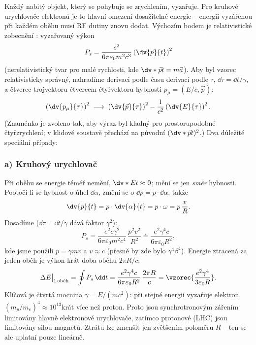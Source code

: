 Každý nabitý objekt, který se pohybuje se zrychlením, vyzařuje. Pro
kruhové urychlovače elektronů je to hlavní omezení dosažitelné energie --
energii vyzářenou při každém oběhu musí RF dutiny znovu dodat. Výchozím
bodem je relativistické zobecnění : vyzařovaný výkon
\[
  P_s=\frac{e^2}{6\pi\varepsilon_0 m^2c^3}\left(\dv{\vec p}{t}\right)^2
\]
(nerelativistický tvar pro malé rychlosti, kde \(\dv*{\vec p}{t}=m\vec a\)).
Aby byl vzorec relativisticky správný, nahradíme derivaci podle času
derivací podle  \(\tau\), \(\dd\tau=\dd t/\gamma\), a
čtverec trojvektoru čtvercem čtyřvektoru hybnosti \(p_\mu=(E/c,\vec p)\):
\[
  \left(\dv{p_\mu}{\tau}\right)^2\;\longrightarrow\;
  \left(\dv{\vec p}{\tau}\right)^2-\frac{1}{c^2}\left(\dv{E}{\tau}\right)^2 .
\]
(Znaménko je zvoleno tak, aby výraz byl kladný pro prostorupodobné
čtyřzrychlení; v klidové soustavě přechází na původní
\((\dv*{\vec p}{t})^2\).) Dva důležité speciální případy:

\subsubsection*{a) Kruhový urychlovač}
Při oběhu se energie téměř nemění, \(\dv*{E}{t}\approx0\); mění se jen
\emph{směr} hybnosti. Pootočí-li se hybnost o úhel \(\dd\alpha\), změní se
o \(\dd p=p\cdot\dd\alpha\), takže
\[
  \dv{p}{t}=p\cdot\dv{\alpha}{t}=p\cdot\omega=p\,\frac{v}{R} .
\]
Dosadíme (\(\dd\tau=\dd t/\gamma\) dává faktor \(\gamma^2\)):
\[
  P_s=\frac{e^2c\gamma^2}{6\pi\varepsilon_0 m^2c^4}\,\frac{p^2v^2}{R^2}
  \doteq\frac{e^2\gamma^4c}{6\pi\varepsilon_0R^2},
\]
kde jsme použili \(p=\gamma mv\) a \(v\approx c\) (přesně by zde bylo
\(\gamma^4\beta^4\)). Energie ztracená za jeden oběh je výkon krát doba
oběhu \(2\pi R/c\):
\[
  \Delta E\big|_{1\,\text{oběh}}=\oint P_s\,\dd t
  =\frac{e^2\gamma^4c}{6\pi\varepsilon_0R^2}\,\frac{2\pi R}{c}
  =\vzorec{\frac{e^2\gamma^4}{3\varepsilon_0R}} .
\]
Klíčová je čtvrtá mocnina \(\gamma=E/(mc^2)\): při stejné energii vyzařuje
elektron \((m_p/m_e)^4\approx10^{13}\)krát více než proton. Proto jsou
synchrotronovým zářením limitovány hlavně elektronové urychlovače, zatímco
protonové (LHC) jsou limitovány silou magnetů. Ztrátu lze zmenšit jen
zvětšením poloměru \(R\) -- ten se ale uplatní pouze lineárně.

